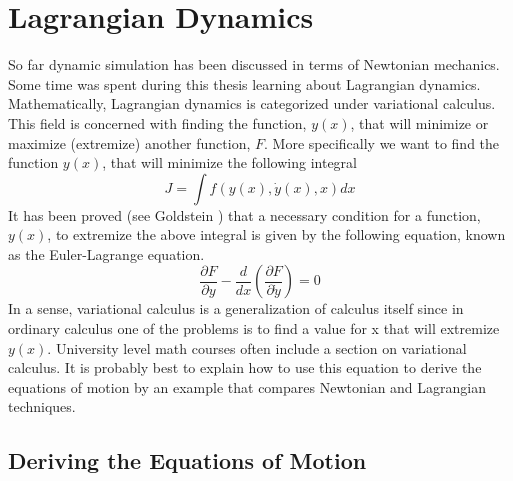 \section{Lagrangian Dynamics}
\label{Sec:LagrangianDynamics}
So far dynamic simulation has been discussed in terms of Newtonian mechanics.
Some time was spent during this thesis learning about Lagrangian dynamics.
Mathematically, Lagrangian dynamics is categorized under variational calculus.
This field is concerned with finding the function, $y(x)$, that will
minimize or maximize (extremize) another function, $F$. More specifically we
want to find the function $y(x)$, that will minimize the following integral
\[
J = \int f(y(x), \dot{y}(x), x) dx
\]
It has been proved (see Goldstein \cite[pg 37 - 39]{Goldstein}) that a necessary condition for a
function, $y(x)$, to extremize the above integral is given by the following
equation, known as the Euler-Lagrange equation.
\begin{equation}
	\label{Eqn:EulerLagrange}
	\frac{\partial F}{\partial y} - \frac{d}{dx}\left(\frac{\partial F}{\partial \dot{y}}\right) = 0
\end{equation}
In a sense, variational calculus is a generalization of calculus itself since in
ordinary calculus one of the problems is to find a value for x that will
extremize $y(x)$. University level math courses often include a section on
variational calculus. It is probably
best to explain how to use this equation to derive the equations of motion by an
example that compares Newtonian and Lagrangian techniques.
\subsection{Deriving the Equations of Motion}
\label{Sec:DerivingTheEquationsOfMotion}
